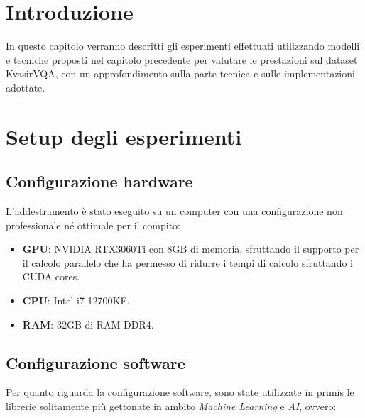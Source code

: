 \documentclass[../main.tex]{subfiles}
\begin{document}
\section{Introduzione}

In questo capitolo verranno descritti gli esperimenti effettuati utilizzando modelli e tecniche proposti nel capitolo precedente per valutare le prestazioni sul dataset KvasirVQA, con un approfondimento sulla parte tecnica e sulle implementazioni adottate.

\section{Setup degli esperimenti}

\subsection{Configurazione hardware}L'addestramento è stato eseguito su un computer con una configurazione non professionale né ottimale per il compito:  

\begin{itemize}
    \item \textbf{GPU}: NVIDIA RTX3060Ti con 8GB di memoria, sfruttando il supporto per il calcolo parallelo che ha permesso di ridurre i tempi di calcolo sfruttando i CUDA cores.
    \item \textbf{CPU}: Intel i7 12700KF.
    \item \textbf{RAM}: 32GB di RAM DDR4.
\end{itemize}

\subsection{Configurazione software}

Per quanto riguarda la configurazione software, sono state utilizzate in primis le librerie solitamente più gettonate in ambito \textit{Machine Learning} e \textit{AI}, ovvero:
\end{document}
